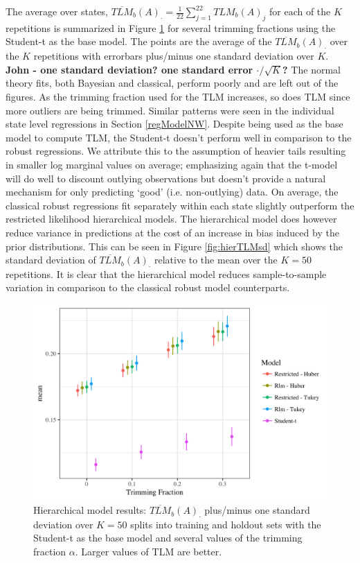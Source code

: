 \documentclass[ba]{imsart}
\begin{document}
The average over states, $\overline{TLM}_b(A)_{\cdot}= \frac{1}{22} \sum_{j =1}^{22} TLM_b(A)_{j}$ for each of the $K$ repetitions is summarized in Figure
\ref{fig:hierTLM} for several trimming fractions using the Student-t as the base model. The points are the average of the $\overline{TLM}_b(A)_{\cdot}$ over the $K$ repetitions with errorbars plus/minus one standard deviation over $K$. {\bf John - one standard deviation?  one standard error $\cdot / \sqrt{K}$?} The normal theory fits, both Bayesian and classical, perform poorly and are left out of the figures. As the trimming fraction used for the TLM increases, so does TLM since more outliers are being trimmed. Similar patterns were seen in the individual state level regressions in Section \ref{regModelNW}. Despite being used as the base model to compute TLM, the Student-t doesn't perform well in comparison to the robust regressions. We attribute this to the assumption of heavier tails resulting in smaller log marginal values on average; emphasizing again that the t-model will do well to discount outlying observations but doesn't provide a natural mechanism for only predicting `good' (i.e. non-outlying) data. On average, the classical robust regressions fit separately within each state slightly outperform the restricted likelihood hierarchical models. The hierarchical model does however reduce variance in predictions at the cost of an increase in bias induced by the prior distributions. This can be seen in Figure \ref{fig:hierTLMsd} which shows the standard deviation of $\overline{TLM}_b(A)_{\cdot}$ relative to the mean over the $K=50$ repetitions. It is clear that the hierarchical model reduces sample-to-sample variation in comparison to the classical robust model counterparts.

\begin{figure}[t]
\centering
\includegraphics[width=6in]{hier_average_tlm.png}
\caption{Hierarchical model results: $\overline{TLM}_b(A)_{\cdot}$  plus/minus one standard deviation over $K = 50$ splits into training and holdout sets with the Student-t as the base model and several values of the trimming fraction $\alpha$. Larger values of TLM are better.}
\label{fig:hierTLM}
\end{figure}
\end{document}
